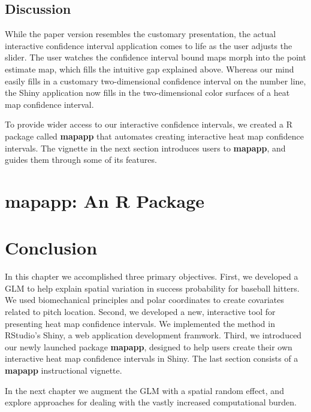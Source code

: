 \subsection{Discussion}

While the paper version resembles the customary presentation, the actual interactive confidence interval application comes to life as the user adjusts the slider. The user watches the confidence interval bound maps morph into the point estimate map, which fills the intuitive gap explained above. Whereas our mind easily fills in a customary two-dimensional confidence interval on the number line, the Shiny application now fills in the two-dimensional color surfaces of a heat map confidence interval.

To provide wider access to our interactive confidence intervals, we created a R package called {\bf mapapp} that automates creating interactive heat map confidence intervals. The vignette in the next section introduces users to {\bf mapapp}, and guides them through some of its features. 

\section{{\bf mapapp}: An R Package}

\section{Conclusion}

In this chapter we accomplished three primary objectives. First, we developed a GLM to help explain spatial variation in success probability for baseball hitters. We used biomechanical principles and polar coordinates to create covariates related to pitch location. Second, we developed a new, interactive tool for presenting heat map confidence intervals. We implemented the method in RStudio's Shiny, a web application development framwork. Third, we introduced our newly launched package {\bf mapapp}, designed to help users create their own interactive heat map confidence intervals in Shiny. The last section consists of a {\bf mapapp} instructional vignette.

In the next chapter we augment the GLM with a spatial random effect, and explore approaches for dealing with the vastly increased computational burden.

